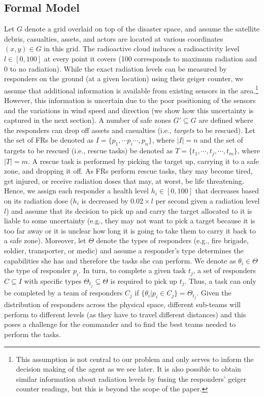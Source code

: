 \subsection{Formal Model}
\noindent Let $G$ denote a grid overlaid on top of the disaster space, and assume the satellite debris, casualties, assets, and actors are located at various coordinates $(x,y) \in G$ in this grid. The radioactive cloud induces a radioactivity level  $l \in [0,100]$ at every point it covers (100 corresponds to maximum radiation and 0 to no radiation). While the exact radiation levels can be measured by responders on the ground (at a given location) using their geiger counter, we assume that additional information is available  from existing sensors  in the area.\footnote{This assumption is not central to our problem and only serves to inform the decision making of the agent as we see later. It is also possible to obtain similar information about radiation levels by fusing the responders' geiger counter readings, but this is beyond the scope of the paper.} However, this information is uncertain due to the poor positioning of the sensors and the variations in wind speed and direction (we show how this uncertainty is captured in the next section). A number of safe zones $G' \subseteq G$ are defined where the responders can drop off assets and casualties (i.e., \emph{targets} to be rescued). Let the set of FRs be denoted as $I = \{p_1, \cdots p_i \cdots, p_n\}$, where $|I| = n$ and the set of  targets to be rescued (i.e., rescue tasks) be denoted as  $T = \{t_1,\cdots, t_j, \cdots, t_m\}$, where $|T| = m$. A rescue task is performed by picking the target up, carrying it to a safe zone, and dropping it off.  As FRs perform rescue tasks, they may become tired, get injured, or receive radiation doses that may, at worst, be life threatening. Hence, we assign each responder  a health level $h_i\in [0,100]$ that decreases based on its radiation dose ($h_i$ is decreased by $0.02 \times l$ per second given a radiation level $l$) and assume that its decision to pick up and carry the target allocated to it is liable to some uncertainty (e.g., they may not want to pick a target because it is too far away or it is unclear how long it is going to take them to  carry it back  to a safe zone).  Moreover, let $\Theta$ denote the types of responders (e.g., fire brigade, soldier, transporter, or medic)  and assume a responder's type determines the capabilities  she has and therefore the tasks  she can perform. We denote as $\theta_i \in \Theta$ the type of responder $p_i$. In turn, to complete a given task $t_j$,  a set of responders $C \subseteq I$ with specific types $\Theta_{t_j} \subseteq \Theta$ is required to pick up $t_j$. Thus, a task can only be completed by a team of responders $C_j$ if $\{\theta_i | p_i \in C_j\} = \Theta_{t_j}$. Given the distribution of responders across the physical space, different sub-teams will perform to different levels (as they have to travel different distances) and this poses a challenge for the commander and to find the best teams needed to perform the tasks.
